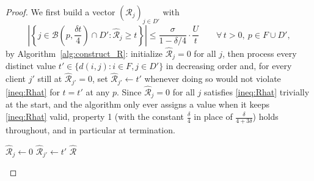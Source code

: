 \documentclass[a4paper,11pt]{article}
\begin{document}
\begin{proof}
We first build a vector $(\hat{\mathcal{R}}_j)_{j\in D'}$ with
\begin{equation}
\label{ineq:Rhat}
\left| \left\{ j \in \mathcal{B} \left( p, \frac{\delta t}{4} \right)
\cap D' : \hat{\mathcal{R}}_j \ge t \right\} \right| \le \frac{\sigma}{1 -
\delta/4} \cdot \frac{U}{t} \qquad \forall\, t>0,\ p\in F\cup D',
\end{equation}
by {Algorithm~\ref{alg:construct_R}}: initialize $\hat{\mathcal{R}}_j=0$ for all
$j$, then process every distinct value $t'\in\{d(i,j): i\in F, j\in D'\}$
in decreasing order and, for every client $j'$ still at $\hat{\mathcal{R}}_{j'}=0$,
set $\hat{\mathcal{R}}_{j'}\gets t'$ whenever doing so would not violate
\eqref{ineq:Rhat} for $t=t'$ at any $p$. Since $\hat{\mathcal{R}}_j=0$ for all $j$
satisfies \eqref{ineq:Rhat} trivially at the start, and the algorithm
only ever assigns a value when it keeps \eqref{ineq:Rhat} valid, property
1 (with the constant $\frac{\delta}{4}$ in place of
$\frac{\delta}{4+3\delta}$) holds throughout, and in particular at
termination.

\begin{algorithm}
\caption{Construct $\hat{\mathcal{R}}$} \label{alg:construct_R}
\begin{algorithmic}[1]
    \State $\hat{\mathcal{R}}_j \gets 0$
    \EndFor
    \State $\hat{\mathcal{R}}_{j'} \gets t'$
    \EndIf
    \EndFor
    \EndFor
\State \Return $\hat{\mathcal{R}}$
\end{algorithmic}
\end{algorithm}


\end{proof}
\end{document}
